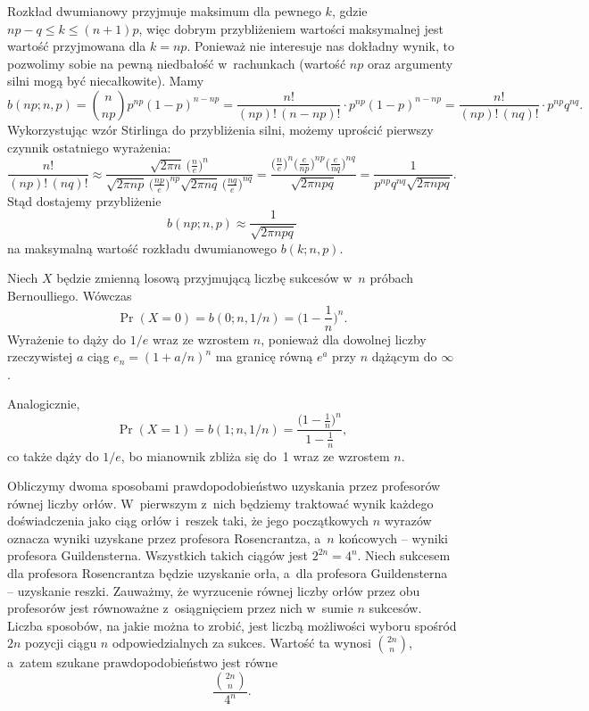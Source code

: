 \exercise %
Rozkład dwumianowy przyjmuje maksimum dla pewnego $k$, gdzie $np-q\le k\le(n+1)p$, więc dobrym przybliżeniem wartości maksymalnej jest wartość przyjmowana dla $k=np$. Ponieważ nie interesuje nas dokładny wynik, to pozwolimy sobie na pewną niedbałość w~rachunkach (wartość $np$ oraz argumenty silni mogą być niecałkowite). Mamy
\[
	b(np;n,p) = \binom{n}{np}p^{np}(1-p)^{n-np} = \frac{n!}{(np)!\,(n-np)!}\cdot p^{np}(1-p)^{n-np} = \frac{n!}{(np)!\,(nq)!}\cdot p^{np}q^{nq}.
\]
Wykorzystując wzór Stirlinga do przybliżenia silni, możemy uprościć pierwszy czynnik ostatniego wyrażenia:
\[
	\frac{n!}{(np)!\,(nq)!} \approx \frac{\sqrt{2\pi n}\,\bigl(\frac{n}{e}\bigr)^n}{\sqrt{2\pi np}\,\bigl(\frac{np}{e}\bigr)^{np}\sqrt{2\pi nq}\,\bigl(\frac{nq}{e}\bigr)^{nq}} = \frac{\bigl(\frac{n}{e}\bigr)^n\bigl(\frac{e}{np}\bigr)^{np}\bigl(\frac{e}{nq}\bigr)^{nq}}{\sqrt{2\pi npq}} = \frac{1}{p^{np}q^{nq}\sqrt{2\pi npq}}.
\]
Stąd dostajemy przybliżenie
\[
	b(np;n,p) \approx \frac{1}{\sqrt{2\pi npq}}
\]
na maksymalną wartość rozkładu dwumianowego $b(k;n,p)$.

\exercise %
Niech $X$ będzie zmienną losową przyjmującą liczbę sukcesów w~$n$ próbach Bernoulliego. Wówczas
\[
	\Pr(X=0) = b(0;n,1/n) = \biggl(1-\frac{1}{n}\biggr)^n.
\]
Wyrażenie to dąży do $1/e$ wraz ze wzrostem $n$, ponieważ dla dowolnej liczby rzeczywistej $a$ ciąg $e_n={(1+a/n)}^n$ ma granicę równą $e^a$ przy $n$ dążącym do $\infty$.

Analogicznie,
\[
	\Pr(X=1) = b(1;n,1/n) = \frac{\bigl(1-\frac{1}{n}\bigr)^n}{1-\frac{1}{n}},
\]
co także dąży do $1/e$, bo mianownik zbliża się do~1 wraz ze wzrostem $n$.

\exercise %
Obliczymy dwoma sposobami prawdopodobieństwo uzyskania przez profesorów równej liczby orłów. W~pierwszym z~nich będziemy traktować wynik każdego doświadczenia jako  ciąg orłów i~reszek taki, że jego początkowych $n$ wyrazów oznacza wyniki uzyskane przez profesora Rosencrantza, a~$n$ końcowych -- wyniki profesora Guildensterna. Wszystkich takich ciągów jest $2^{2n}=4^n$. Niech sukcesem dla profesora Rosencrantza będzie uzyskanie orła, a~dla profesora Guildensterna -- uzyskanie reszki. Zauważmy, że wyrzucenie równej liczby orłów przez obu profesorów jest równoważne z~osiągnięciem przez nich w~sumie $n$ sukcesów. Liczba sposobów, na jakie można to zrobić, jest liczbą możliwości wyboru spośród $2n$ pozycji ciągu $n$ odpowiedzialnych za sukces. Wartość ta wynosi $\binom{2n}{n}$, a~zatem szukane prawdopodobieństwo jest równe
\[
	\frac{\binom{2n}{n}}{4^n}.
\]

